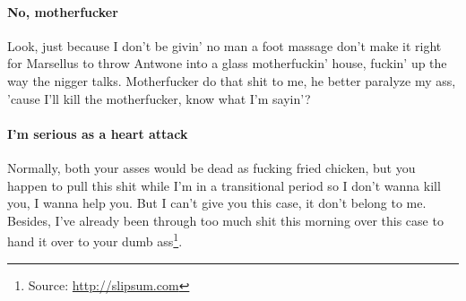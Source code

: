 \paragraph{No, motherfucker}
Look, just because I don't be givin' no man a foot massage don't make it right for Marsellus to throw Antwone into a glass motherfuckin' house, fuckin' up the way the nigger talks. Motherfucker do that shit to me, he better paralyze my ass, 'cause I'll kill the motherfucker, know what I'm sayin'?

\paragraph{I'm serious as a heart attack}
Normally, both your asses would be dead as fucking fried chicken, but you happen to pull this shit while I'm in a transitional period so I don't wanna kill you, I wanna help you. But I can't give you this case, it don't belong to me. Besides, I've already been through too much shit this morning over this case to hand it over to your dumb ass\footnote{Source: \url{http://slipsum.com}}.

